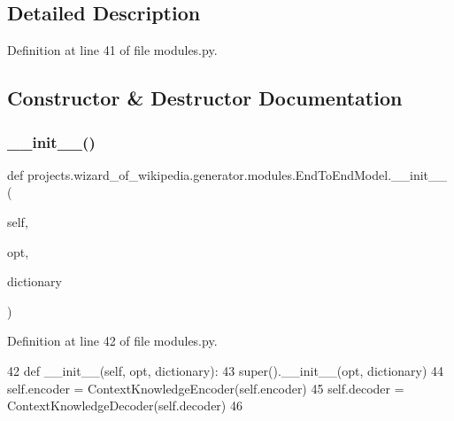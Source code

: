 \subsection{Detailed Description}


Definition at line 41 of file modules.\+py.



\subsection{Constructor \& Destructor Documentation}
\mbox{\label{classprojects_1_1wizard__of__wikipedia_1_1generator_1_1modules_1_1EndToEndModel_a247a986cf18f9711f93d2336d653779e}} 
\subsubsection{\texorpdfstring{\+\_\+\+\_\+init\+\_\+\+\_\+()}{\_\_init\_\_()}}
{\footnotesize\ttfamily def projects.\+wizard\+\_\+of\+\_\+wikipedia.\+generator.\+modules.\+End\+To\+End\+Model.\+\_\+\+\_\+init\+\_\+\+\_\+ (\begin{DoxyParamCaption}\item[{}]{self,  }\item[{}]{opt,  }\item[{}]{dictionary }\end{DoxyParamCaption})}



Definition at line 42 of file modules.\+py.


\begin{DoxyCode}
42     \textcolor{keyword}{def }\_\_init\_\_(self, opt, dictionary):
43         super().\_\_init\_\_(opt, dictionary)
44         self.encoder = ContextKnowledgeEncoder(self.encoder)
45         self.decoder = ContextKnowledgeDecoder(self.decoder)
46 
\end{DoxyCode}


